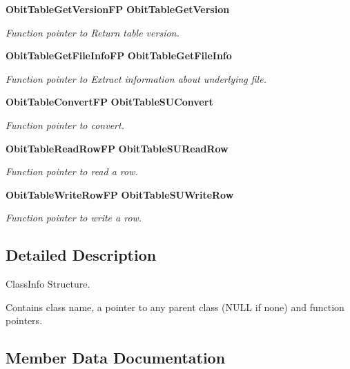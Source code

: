 \begin{CompactItemize}
{\bf Obit\-Table\-Get\-Version\-FP} {\bf Obit\-Table\-Get\-Version}
\begin{CompactList}\small\item\em Function pointer to Return table version. \item\end{CompactList}\item 
{\bf Obit\-Table\-Get\-File\-Info\-FP} {\bf Obit\-Table\-Get\-File\-Info}
\begin{CompactList}\small\item\em Function pointer to Extract information about underlying file. \item\end{CompactList}\item 
{\bf Obit\-Table\-Convert\-FP} {\bf Obit\-Table\-SUConvert}
\begin{CompactList}\small\item\em Function pointer to convert. \item\end{CompactList}\item 
{\bf Obit\-Table\-Read\-Row\-FP} {\bf Obit\-Table\-SURead\-Row}
\begin{CompactList}\small\item\em Function pointer to read a row. \item\end{CompactList}\item 
{\bf Obit\-Table\-Write\-Row\-FP} {\bf Obit\-Table\-SUWrite\-Row}
\begin{CompactList}\small\item\em Function pointer to write a row. \item\end{CompactList}\end{CompactItemize}


\subsection{Detailed Description}
Class\-Info Structure. 

Contains class name, a pointer to any parent class (NULL if none) and function pointers. 



\subsection{Member Data Documentation}
